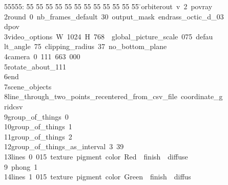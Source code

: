 %
%
\begin{tabbing}
55555: \= 55 \= 55 \= 55 \= 55 \= 55 \= 55 \= 55 \= 55 \= 55 \= 55 \= 55 \= 55 \= \>orbiterout\ v\ 2\ povray\ \\[0pt]
2\>\>round\ 0\ nb\_frames\_default\ 30\ output\_mask\ endrass\_octic\_d\_03\\[0pt]
\>dpov\ \\[0pt]
3\>\>video\_options\ W\ 1024\ H\ 768\ \ global\_picture\_scale\ 075\ defau\\[0pt]
\>lt\_angle\ 75\ clipping\_radius\ 37\ no\_bottom\_plane\ \\[0pt]
4\>\>camera\ 0\ 111\ 663\ 000\ \ \\[0pt]
5\>\>rotate\_about\_111\ \\[0pt]
6\>\>end\ \\[0pt]
7\>\>scene\_objects\ \\[0pt]
8\>\>\>line\_through\_two\_points\_recentered\_from\_csv\_file\ coordinate\_g\\[0pt]
\>ridcsv\ \\[0pt]
9\>\>\>group\_of\_things\ 0\ \\[0pt]
10\>\>\>group\_of\_things\ 1\ \\[0pt]
11\>\>\>group\_of\_things\ 2\ \\[0pt]
12\>\>\>group\_of\_things\_as\_interval\ 3\ 39\ \\[0pt]
13\>\>\>lines\ 0\ 015\ texture\ pigment\ color\ Red\ \ finish\ \ diffuse\ \\[0pt]
9\ phong\ 1\ \\[0pt]
14\>\>\>lines\ 1\ 015\ texture\ pigment\ color\ Green\ \ finish\ \ diffus\\[0pt]

\end{tabbing}
